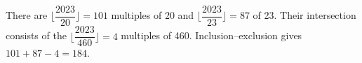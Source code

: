There are $\lfloor\dfrac{2023}{20}\rfloor=101$ multiples of 20 and $\lfloor\dfrac{2023}{23}\rfloor=87$ of 23. Their intersection consists of the $\lfloor\dfrac{2023}{460}\rfloor=4$ multiples of 460. Inclusion--exclusion gives $101+87-4=\boxed{184}$.
